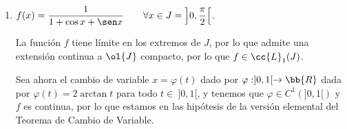 \begin{ejercicio}
\begin{enumerate}
        Además, $\varphi\in C^1\left(\left]\nicefrac{\pi}{4},\nicefrac{\pi}{2}\right[\right)$, $\varphi\left(\left]\nicefrac{\pi}{4},\nicefrac{\pi}{2}\right[\right)=J$ y $\varphi'(t)\neq 0$ para todo $t\in \left]\nicefrac{\pi}{4},\nicefrac{\pi}{2}\right[$.
        Por tanto, estamos en las hipótesis del Teorema de Cambio de Variable, por lo que $f\in \cc{L}_1\left(\left]1,+\infty\right[\right)$ si, y sólo si, $(f\circ \varphi)\varphi'$ es integrable en $\left]\nicefrac{\pi}{4},\nicefrac{\pi}{2}\right[$.
        Tenemos que:
        \begin{equation*}
            (f\circ \varphi)(t)\cdot \varphi'(t) = \frac{1}{\tg^2(x)\cdot \sqrt{1+\tg^2(x)}}\cdot \frac{1}{\cos^2(x)}
            = \frac{1}{\sen^2(x)\cdot \sqrt{\frac{1}{\cos^2(x)}}}
            = \frac{\cos (x)}{\sen^2(x)}
        \end{equation*}

        La función obtenida tiene límite en $\nicefrac{\pi}{4}$ y $\nicefrac{\pi}{2}$, por lo que admite una extensión continua a $\left[\nicefrac{\pi}{4},\nicefrac{\pi}{2}\right]$,
        por lo que es integrable en $\left(\left]\nicefrac{\pi}{4},\nicefrac{\pi}{2}\right[\right)$. Por tanto, $(f\circ \varphi)\varphi'$ es integrable en $\left]\nicefrac{\pi}{4},\nicefrac{\pi}{2}\right[$, por lo que $f\in \cc{L}_1\left(J\right)$.

        Por el Teorema de Cambio de Variable, y posteriormente por la Regla de Barrow, tenemos que:
        \begin{align*}
            \int_1^{+\infty} \dfrac{1}{x^2\sqrt{1+x^2}}~dx
            =& \int_{\nicefrac{\pi}{4}}^{\nicefrac{\pi}{2}} \dfrac{\cos (x)}{\sen^2(x)}~dx
            = \left[-\frac{1}{\sen x}\right]_{\nicefrac{\pi}{4}}^{\nicefrac{\pi}{2}}
            =\\&= -\frac{1}{\sen\left(\nicefrac{\pi}{2}\right)} + \frac{1}{\sen\left(\nicefrac{\pi}{4}\right)}
            = \sqrt{2}-1
        \end{align*}


        \item $f(x)=\dfrac{1}{1+\cos x + \sen x} \qquad \forall x\in J=\left]0,\dfrac{\pi}{2}\right[$.
        
        La función $f$ tiene límite en los extremos de $J$, por lo que admite una extensión continua a $\ol{J}$ compacto, por lo que $f\in \cc{L}_1(J)$.

        Sea ahora el cambio de variable $x=\varphi(t)$ dado por $\varphi:]0,1[\to \bb{R}$ dada por $\varphi(t)=2\arctan t$ para todo $t\in~]0,1[$, y tenemos que $\varphi\in C^1(]0,1[)$ y $f$ es continua,
        por lo que estamos en las hipótesis de la versión elemental del Teorema de Cambio de Variable.
        

\end{enumerate}
\end{ejercicio}
